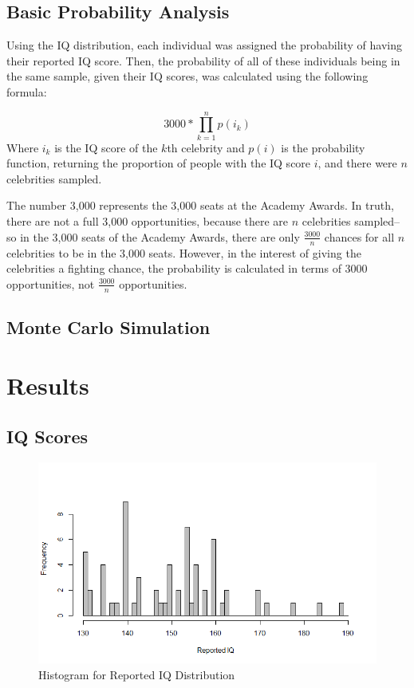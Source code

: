 \documentclass[12pt,letterpaper,titlepage,oneside]{article}
\begin{document}
\subsection{Basic Probability Analysis}
\label{probanal}
Using the IQ distribution, each individual was assigned the probability of having their reported IQ score. Then, the probability of all of these individuals being in the same sample, given their IQ scores, was calculated using the following formula:

\begin{equation}
3000 * \prod_{k=1}^n p(i_k)
\end{equation}
Where $i_k$ is the IQ score of the $k$th celebrity and $p(i)$ is the probability function, returning the proportion of people with the IQ score $i$, and there were $n$ celebrities sampled.

The number 3,000 represents the 3,000 seats at the Academy Awards. In truth, there are not a full 3,000 opportunities, because there are $n$ celebrities sampled--so in the 3,000 seats of the Academy Awards, there are only $\frac{3000}{n}$ chances for all $n$ celebrities to be in the 3,000 seats. However, in the interest of giving the celebrities a fighting chance, the probability is calculated in terms of 3000 opportunities, not $\frac{3000}{n}$ opportunities.

\subsection{Monte Carlo Simulation} 

\section{Results}
\subsection{IQ Scores}

\begin{figure}[h!]
\caption{Histogram for Reported IQ Distribution}
\label{iqhist}
\includegraphics[scale=.5]{reported-iq}
\end{figure}
\end{document}
